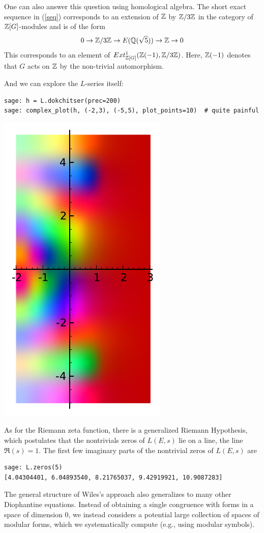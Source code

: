 \documentclass{book}
\begin{document}
One can also answer this question using homological algebra. The short exact sequence in (\ref{seq}) corresponds to an extension of $\mathbb{Z}$ by $\mathbb{Z}/3\mathbb{Z}$ in the category of $\mathbb{Z}[G]$-modules and is of the form
\begin{align} \label{seq1}
0 \rightarrow  \mathbb{Z}/3\mathbb{Z} \rightarrow E(\mathbb{Q}(\sqrt{5})) \rightarrow  \mathbb{Z} \rightarrow  0
\end{align}
This corresponds to an element of $Ext^{1}_{\mathbb{Z}[G]}(\mathbb{Z}(-1),\mathbb{Z}/3\mathbb{Z})$.
Here, $\mathbb{Z}(-1)$ denotes that $G$ acts on $\mathbb{Z}$ by the non-trivial automorphism.


And we can explore the $L$-series itself:

\begin{lstlisting}
sage: h = L.dokchitser(prec=200)
sage: complex_plot(h, (-2,3), (-5,5), plot_points=10)  # quite painful
\end{lstlisting}

\begin{center}
\includegraphics[width=.4\textwidth]{pics/27a-lser1.pdf}
\end{center}

As for the Riemann zeta function, there is a generalized Riemann
Hypothesis, which postulates that the nontrivials zeros of
$L(E,s)$ lie on a line, the line $\Re(s)=1$.
The first few imaginary parts of the nontrivial zeros of $L(E,s)$ are
\begin{lstlisting}
sage: L.zeros(5)
[4.04304401, 6.04893540, 8.21765037, 9.42919921, 10.9087283]
\end{lstlisting}

The general structure of Wiles's approach also generalizes to many other
Diophantine equations.  Instead of obtaining a single congruence with
forms in a space of dimension 0, we instead considers a potential
large collection of spaces of modular forms, which we systematically
compute (e.g., using modular symbols).
\end{document}
